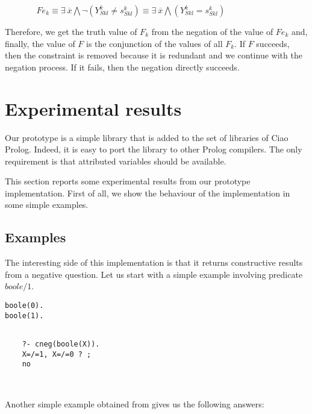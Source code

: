 \documentclass{tlp}
\begin{document}
$~~~~~~~~~~~~~~~~~  Fe_k  \equiv \exists ~ \overline{x} \bigwedge \neg (Y_{Sk l}^k \neq s_{Sk l}^k)  \equiv \exists ~ \overline{x} \bigwedge (Y_{Sk l}^k = s_{Sk l}^k)  $

        Therefore, we get the truth value of $F_k$ from the
        negation of the value of $Fe_k$ and, finally, the value of $F$ is
        the conjunction of the values of all $F_k$. If $F$
        succeeds, then the constraint is removed because it is redundant
        and we continue with the negation process. If it fails, then
        the negation directly succeeds.


\section{Experimental results}
\label{results}

Our prototype is a simple library that is added to the set of
libraries of Ciao Prolog. Indeed, it is easy to port the library to
other Prolog compilers. The only requirement is that attributed
variables should be available.

This section reports some experimental results from our prototype
implementation.  First of all, we show the behaviour of the
implementation in some simple examples.

\vspace{-0.1in}

\subsection{Examples}
\label{examples}

The interesting side of this implementation is that it returns
constructive results from a negative question. Let us start with a
simple example involving predicate $boole/1$.

{\small
\begin{minipage}{2in}
\begin{verbatim}
boole(0).
boole(1).
\end{verbatim}
\end{minipage}
\begin{minipage}{2in}
\begin{verbatim} 

    ?- cneg(boole(X)).
    X=/=1, X=/=0 ? ;
    no

\end{verbatim} 
\end{minipage}\\
}
Another simple example obtained from \cite{Stuckey95} gives us the
following answers:
\end{document}
